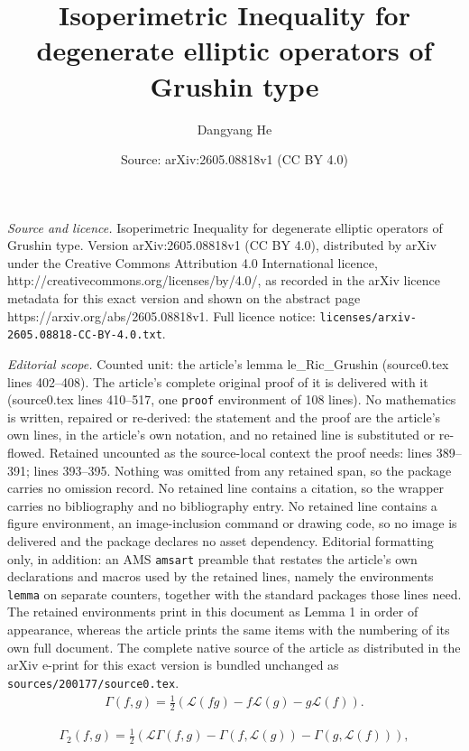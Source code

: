 \documentclass[10pt,a4paper]{amsart}
\title{Isoperimetric Inequality for degenerate elliptic operators of Grushin type}
\author{Dangyang He}
\date{Source: arXiv:2605.08818v1 (CC BY 4.0)}
\begin{document}
\maketitle

\noindent\emph{Source and licence.} Isoperimetric Inequality for degenerate elliptic operators of Grushin type. Version arXiv:2605.08818v1 (CC BY 4.0), distributed by arXiv under the Creative Commons Attribution 4.0 International licence, http://creativecommons.org/licenses/by/4.0/, as recorded in the arXiv licence metadata for this exact version and shown on the abstract page https://arxiv.org/abs/2605.08818v1. Full licence notice: \texttt{licenses/arxiv-2605.08818-CC-BY-4.0.txt}.\par\smallskip

\noindent\textit{Editorial scope.} Counted unit: the article's lemma le\_Ric\_Grushin (source0.tex lines 402--408). The article's complete original proof of it is delivered with it (source0.tex lines 410--517, one \texttt{proof} environment of 108 lines). No mathematics is written, repaired or re-derived: the statement and the proof are the article's own lines, in the article's own notation, and no retained line is substituted or re-flowed.  Retained uncounted as the source-local context the proof needs: lines 389--391; lines 393--395.  Nothing was omitted from any retained span, so the package carries no omission record.  No retained line contains a citation, so the wrapper carries no bibliography and no bibliography entry.  No retained line contains a figure environment, an image-inclusion command or drawing code, so no image is delivered and the package declares no asset dependency.  Editorial formatting only, in addition: an AMS \texttt{amsart} preamble that restates the article's own declarations and macros used by the retained lines, namely the environments \texttt{lemma} on separate counters, together with the standard packages those lines need.  The retained environments print in this document as Lemma 1 in order of appearance, whereas the article prints the same items with the numbering of its own full document.  The complete native source of the article as distributed in the arXiv e-print for this exact version is bundled unchanged as \texttt{sources/200177/source0.tex}.
\begin{align}\label{carre1}
    \Gamma(f,g) = \frac{1}{2} \left( \mathcal{L}(fg) - f \mathcal{L}(g) - g\mathcal{L}(f)\right).
\end{align}

\begin{align}\label{carre2}
    \Gamma_2(f,g) = \frac{1}{2} \left( \mathcal{L}\Gamma(f,g) - \Gamma(f,\mathcal{L}(g)) - \Gamma(g,\mathcal{L}(f)) \right),
\end{align}
\end{document}
